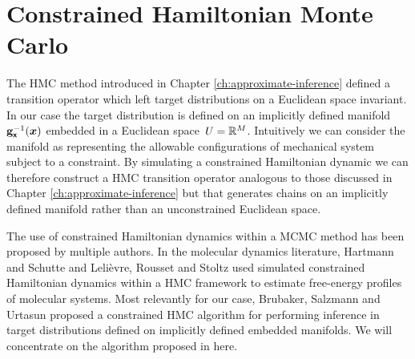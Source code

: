 \section{Constrained Hamiltonian Monte Carlo}\label{sec:chmc}

The \ac{HMC} method introduced in Chapter \ref{ch:approximate-inference} defined a transition operator which left target distributions on a Euclidean space invariant. In our case the target distribution is defined on an implicitly defined manifold ${\mathbf{g}}_{\boldsymbol{\mathsf{x}}}^{-1}(\boldsymbol{x})$ embedded in a Euclidean space $\mathit{U}=\mathbb{R}^M$. Intuitively we can consider the manifold as representing the allowable configurations of mechanical system subject to a constraint. By simulating a constrained Hamiltonian dynamic we can therefore construct a \ac{HMC} transition operator analogous to those discussed in Chapter \ref{ch:approximate-inference} but that generates chains on an implicitly defined manifold rather than an unconstrained Euclidean space.

The use of constrained Hamiltonian dynamics within a \ac{MCMC} method has been proposed by multiple authors. In the molecular dynamics literature, Hartmann and Schutte \citep{hartmann2005constrained} and Leli{\`e}vre, Rousset and Stoltz \citep{lelievre2012langevin} used simulated constrained Hamiltonian dynamics within a \ac{HMC} framework to estimate free-energy profiles of molecular systems. Most relevantly for our case, Brubaker, Salzmann and Urtasun \citep{brubaker2012family} proposed a constrained \ac{HMC} algorithm for performing inference in target distributions defined on implicitly defined embedded manifolds. We will concentrate on the algorithm proposed in \citep{brubaker2012family} here. %


